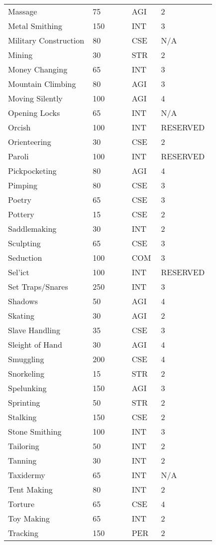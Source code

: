 \documentclass{article}
\begin{document}
\begin{longtable}{@{}p{0.375\linewidth} p{0.178\linewidth} p{0.1\linewidth} p{0.178\linewidth}}
Massage & 75 & AGI & 2 \\
Metal Smithing & 150 & INT & 3 \\
Military Construction & 80 & CSE & N/A \\
Mining & 30 & STR & 2 \\
Money Changing & 65 & INT & 3 \\
Mountain Climbing & 80 & AGI & 3 \\
Moving Silently & 100 & AGI & 4 \\
Opening Locks & 65 & INT & N/A \\
Orcish & 100 & INT & RESERVED \\
Orienteering & 30 & CSE & 2 \\
Paroli & 100 & INT & RESERVED \\
Pickpocketing & 80 & AGI & 4 \\
Pimping & 80 & CSE & 3 \\
Poetry & 65 & CSE & 3 \\
Pottery & 15 & CSE & 2 \\
Saddlemaking & 30 & INT & 2 \\
Sculpting & 65 & CSE & 3 \\
Seduction & 100 & COM & 3 \\
Sel'ict & 100 & INT & RESERVED \\
Set Traps/Snares & 250 & INT & 3 \\
Shadows & 50 & AGI & 4 \\
Skating & 30 & AGI & 2 \\
Slave Handling & 35 & CSE & 3 \\
Sleight of Hand & 30 & AGI & 4 \\
Smuggling & 200 & CSE & 4 \\
Snorkeling & 15 & STR & 2 \\
Spelunking & 150 & AGI & 3 \\
Sprinting & 50 & STR & 2 \\
Stalking & 150 & CSE & 2 \\
Stone Smithing & 100 & INT & 3 \\
Tailoring & 50 & INT & 2 \\
Tanning & 30 & INT & 2 \\
Taxidermy & 65 & INT & N/A \\
Tent Making & 80 & INT & 2 \\
Torture & 65 & CSE & 4 \\
Toy Making & 65 & INT & 2 \\
Tracking & 150 & PER & 2 \\

\end{longtable}
\end{document}
